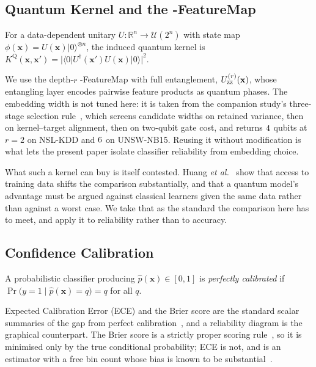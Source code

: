 \documentclass[journal]{IEEEtran}
\begin{document}
\subsection{Quantum Kernel and the \ZZ{}-FeatureMap}
\begin{definition}
For a data-dependent unitary $U:\mathbb{R}^n\!\to\!\mathcal{U}(2^n)$ with
state map $\phi(\mathbf{x})=U(\mathbf{x})|0\rangle^{\otimes n}$, the
induced quantum kernel is
$K^{\mathrm{Q}}(\mathbf{x},\mathbf{x}')=
|\langle 0|U^{\dagger}(\mathbf{x}')U(\mathbf{x})|0\rangle|^2$.
\end{definition}
We use the depth-$r$ \ZZ{}-FeatureMap with full entanglement,
$U^{(r)}_{\textsc{zz}}(\mathbf{x})$, whose entangling layer encodes pairwise
feature products as quantum phases. The embedding width is not tuned here:
it is taken from the companion study's three-stage selection
rule~\cite{companion}, which screens candidate widths on retained variance,
then on kernel--target alignment, then on two-qubit gate cost, and returns
$4$ qubits at $r{=}2$ on NSL-KDD and $6$ on
UNSW-NB15. Reusing it without modification is what lets the present paper
isolate classifier reliability from embedding choice.

What such a kernel can buy is itself contested. Huang \emph{et
al.}~\cite{huang2021power} show that access to training data shifts the
comparison substantially, and that a quantum model's advantage must be
argued against classical learners given the same data rather than against a
worst case. We take that as the standard the comparison here has to meet,
and apply it to reliability rather than to accuracy.

\subsection{Confidence Calibration}
\begin{definition}[Calibration]
A probabilistic classifier producing $\hat{p}(\mathbf{x})\in[0,1]$ is
\emph{perfectly calibrated} if
$\Pr\!\big(y{=}1\mid\hat{p}(\mathbf{x}){=}q\big)=q$ for all $q$.
\end{definition}
Expected Calibration Error (ECE) and the Brier score are the standard
scalar summaries of the gap from perfect
calibration~\cite{naeini2015ece,brier1950}, and a reliability diagram is
the graphical counterpart. The Brier score is a strictly proper scoring
rule~\cite{gneiting2007scoring}, so it is minimised only by the true
conditional probability; ECE is not, and is an estimator with a free bin
count whose bias is known to be substantial~\cite{kumar2019verified}.
\end{document}
